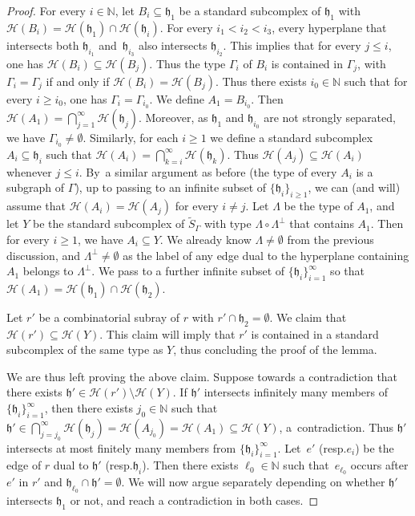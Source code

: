 \documentclass[11pt]{article}
\newcommand{\resp}{resp.\xspace}
\numberwithin{equation}{section}
\let\mathcal\mathscr
\theoremstyle{plain}
\theoremstyle{definition}
\newcommand{\calh}{\mathcal{H}}
\begin{document}
\begin{proof}
For every $i\in\mathbb{N}$, let $B_i\subseteq\mathfrak h_1$ be a standard subcomplex of $\mathfrak h_1$ with $\calh(B_i)=\calh(\mathfrak h_1)\cap \calh(\mathfrak h_i)$. For every $i_1<i_2<i_3$, every hyperplane that intersects both $\mathfrak h_{i_1}$ and~$\mathfrak h_{i_3}$ also intersects $\mathfrak h_{i_2}$. This implies that for every $j\le i$, one has $\calh(B_i)\subseteq \calh(B_j)$. Thus the type $\Gamma_i$ of $B_i$ is contained in $\Gamma_j$, with $\Gamma_i=\Gamma_j$ if and only if $\calh(B_i)=\calh(B_j)$. Thus there exists $i_0\in\mathbb{N}$ such that for every $i\ge i_0$, one has $\Gamma_i=\Gamma_{i_0}$. We define $A_1=B_{i_0}$. Then $\calh(A_1)=\bigcap_{j=1}^{\infty}\calh(\mathfrak h_j)$. Moreover, as $\mathfrak h_1$ and $\mathfrak h_{i_0}$ are not strongly separated, we have $\Gamma_{i_0}\neq\emptyset$. Similarly, for each $i\ge 1$ we define a standard subcomplex $A_i\subseteq \mathfrak h_i$ such that $\calh(A_i)=\bigcap_{k=i}^{\infty}\calh(\mathfrak h_k)$. Thus $\calh(A_j)\subseteq\calh(A_i)$ whenever $j\le i$. By~a similar argument as before (the type of every $A_i$ is a subgraph of $\Gamma$), up to passing to an infinite subset of $\{\mathfrak h_i\}_{i\ge 1}$, we can (and will) assume that $\calh(A_i)=\calh(A_j)$ for every $i\neq j$. Let $\Lambda$ be the type of $A_1$, and let $Y$ be the standard subcomplex of $\widetilde{S}_\Gamma$ with type $\Lambda\circ\Lambda^\perp$ that contains $A_1$. Then for every $i\ge 1$, we have $A_i\subseteq Y$. We already know $\Lambda\neq\emptyset$ from the previous discussion, and $\Lambda^\perp\neq\emptyset$ as the label of any edge dual to the hyperplane containing $A_1$ belongs to $\Lambda^\perp$. We pass to a further infinite subset of $\{\mathfrak h_i\}_{i=1}^\infty$ so that $\calh(A_1)=\calh(\mathfrak h_1)\cap \calh(\mathfrak h_2)$.

Let $r'$ be a combinatorial subray of $r$ with $r'\cap \mathfrak h_2=\emptyset$. We claim that $\calh(r')\subseteq\calh(Y)$. This claim will imply that $r'$ is contained in a standard subcomplex of the same type as $Y$, thus concluding the proof of the lemma.

We are thus left proving the above claim. Suppose towards a contradiction that there exists $\mathfrak h'\in \calh(r')\setminus\calh(Y)$. If $\mathfrak h'$ intersects infinitely many members of $\{\mathfrak h_i\}_{i=1}^\infty$, then there exists $j_0\in\mathbb{N}$ such that $\mathfrak h'\in \bigcap_{j=j_0}^\infty \calh(\mathfrak h_j)= \calh(A_{j_0})=\calh(A_1)\subseteq\calh(Y)$, a~contradiction. Thus $\mathfrak h'$ intersects at most finitely many members from $\{\mathfrak h_i\}_{i=1}^\infty$. Let~$e'$ (\resp $e_i$) be the edge of $r$ dual to $\mathfrak h'$ (\resp $\mathfrak h_i$). Then there exists $\ell_0\in\mathbb{N}$ such that~$e_{\ell_0}$ occurs after $e'$ in $r'$ and $\mathfrak h_{\ell_0}\cap \mathfrak h'=\emptyset$. We will now argue separately depending on whether $\mathfrak{h}'$ intersects $\mathfrak{h}_1$ or not, and reach a contradiction in both cases.


\end{proof}
\end{document}

